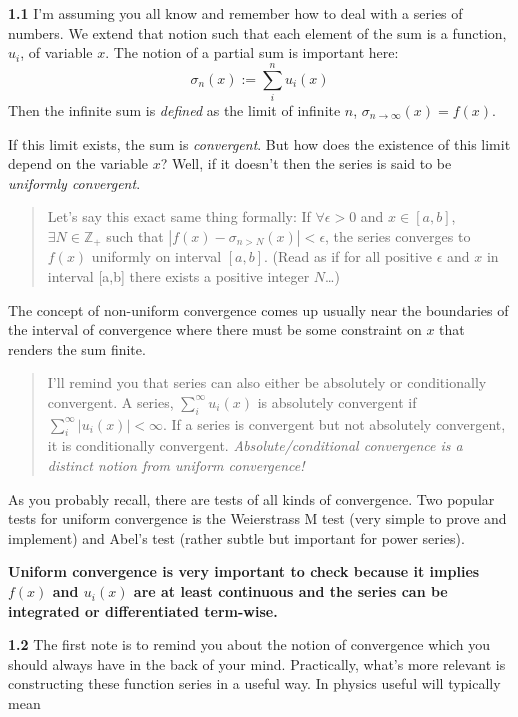 \documentclass[11pt]{article}
\begin{document}
\textbf{1.1} I'm assuming you all know and remember how to deal with a
series of numbers. We extend that notion such that each element of the
sum is a function, \(u_i\), of variable \(x\). The notion of a partial
sum is important here: \[
\sigma_n(x):=\sum^n_iu_i(x)
\] Then the infinite sum is \emph{defined} as the limit of infinite
\(n\), \(\sigma_{n\to \infty}(x)=f(x)\). 
\begin{tcolorbox}[title=Convergence musings]
If this limit exists, the sum
is \emph{convergent}. But how does the existence of this limit depend on
the variable \(x\)? Well, if it doesn't then the series is said to be
\emph{uniformly convergent}.

\begin{quote}
Let's say this exact same thing formally: If \(\forall \epsilon>0\) and
\(x\in[a,b]\), \(\exists N\in \mathbb{Z}_+\) such that
\(|f(x)-\sigma_{n>N}(x)|<\epsilon\), the series converges to \(f(x)\)
uniformly on interval \([a,b]\). (Read as if for all positive
\(\epsilon\) and \(x\) in interval {[}a,b{]} there exists a positive
integer \(N\)\ldots)
\end{quote}

The concept of non-uniform convergence comes up usually near the
boundaries of the interval of convergence where there must be some
constraint on \(x\) that renders the sum finite.

\begin{quote}
I'll remind you that series can also either be absolutely or
conditionally convergent. A series, \(\sum_i^\infty u_i(x)\) is
absolutely convergent if \(\sum_i^\infty |u_i(x)|<\infty\). If a series
is convergent but not absolutely convergent, it is conditionally
convergent. \emph{Absolute/conditional convergence is a distinct notion
from uniform convergence!}
\end{quote}

As you probably recall, there are tests of all kinds of convergence. Two
popular tests for uniform convergence is the Weierstrass M test (very
simple to prove and implement) and Abel's test (rather subtle but
important for power series).

\textbf{Uniform convergence is very important to check because it
implies \(f(x)\) and \(u_i(x)\) are at least continuous and the series
can be integrated or differentiated term-wise.}
\end{tcolorbox}

\textbf{1.2} The first note is to remind you about the notion of
convergence which you should always have in the back of your mind.
Practically, what's more relevant is constructing these function series
in a useful way. In physics useful will typically mean
\end{document}
